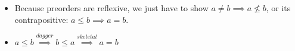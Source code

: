 \begin{itemize}
    \item  Because preorders are reflexive, we just have to show $a \ne b \implies a \not\leq b$, or its contrapositive: $a \leq b \implies a = b$.
    \item $a \leq b \overset{dagger}{\implies} b \leq a \overset{skeletal}{\implies} a = b$
\end{itemize}